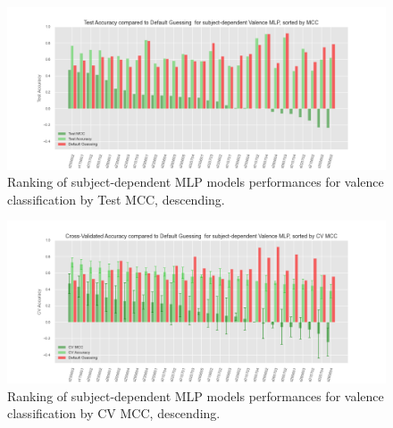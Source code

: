 \begin{figure}[!htb]
\includegraphics[width=16cm]{img/appendix/final_experiment/test_acc_mcc_valence_mlp.png}
\centering
\caption{Ranking of subject-dependent MLP models performances for valence classification by Test MCC, descending.}\label{fig:test_acc_mcc_valence_mlp}
\end{figure}

\begin{figure}[!htb]
\includegraphics[width=16cm]{img/appendix/final_experiment/test_cv_acc_mcc_valence_mlp.png}
\centering
\caption{Ranking of subject-dependent MLP models performances for valence classification by CV MCC, descending.}\label{fig:test_cv_acc_mcc_valence_mlp}
\end{figure}
